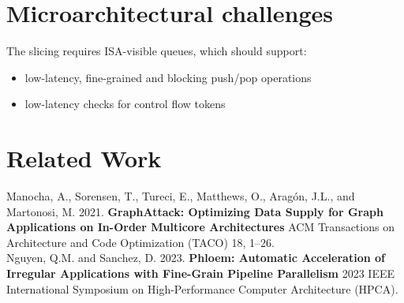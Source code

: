 \documentclass[a0paper,portrait]{myposter}
\begin{document}
{\begin{multicols}{2}
    \section{Microarchitectural challenges}
    The slicing requires ISA-visible queues, which should support:
    \begin{itemize}
    \item low-latency, fine-grained and blocking push/pop operations
    \item low-latency checks for control flow tokens
    \end{itemize}

    \section{Related Work}

    Manocha, A., Sorensen, T., Tureci, E., Matthews, O., Arag{\'{o}}n, J.L., and Martonosi, M. 2021.
    \textbf{GraphAttack: Optimizing Data Supply for Graph Applications on In-Order Multicore Architectures}
    ACM Transactions on Architecture and Code Optimization (TACO) 18, 1–26. \\

    Nguyen, Q.M. and Sanchez, D. 2023.
    \textbf{Phloem: Automatic Acceleration of Irregular Applications with Fine-Grain Pipeline Parallelism}
    2023 IEEE International Symposium on High-Performance Computer Architecture (HPCA).

  \end{multicols}
} %

\end{document}

